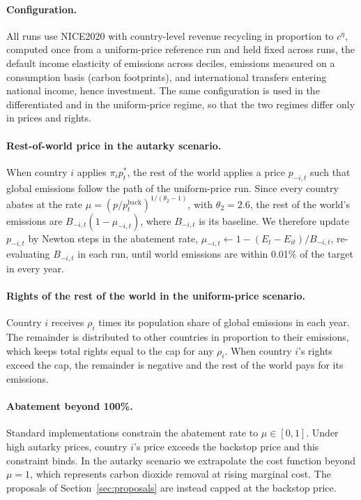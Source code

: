 \documentclass[12pt,english]{article}
\theoremstyle{remark}
\begin{document}
\paragraph{Configuration.} All runs use NICE2020 with country-level revenue recycling in proportion to $c^{\eta}$, computed once from a uniform-price reference run and held fixed across runs, the default income elasticity of emissions across deciles, emissions measured on a consumption basis (carbon footprints), and international transfers entering national income, hence investment. The same configuration is used in the differentiated and in the uniform-price regime, so that the two regimes differ only in prices and rights.

\paragraph{Rest-of-world price in the autarky scenario.} When country $i$ applies $\pi_i p^*_t$, the rest of the world applies a price $p_{-i,t}$ such that global emissions follow the path of the uniform-price run. Since every country abates at the rate $\mu=(p/p^{\mathrm{back}}_t)^{1/(\theta_2-1)}$, with $\theta_2=2.6$, the rest of the world's emissions are $B_{-i,t}(1-\mu_{-i,t})$, where $B_{-i,t}$ is its baseline. We therefore update $p_{-i,t}$ by Newton steps in the abatement rate, $\mu_{-i,t}\leftarrow 1-(E_t-E_{it})/B_{-i,t}$, re-evaluating $B_{-i,t}$ in each run, until world emissions are within 0.01\% of the target in every year.

\paragraph{Rights of the rest of the world in the uniform-price scenario.} Country $i$ receives $\rho_i$ times its population share of global emissions in each year. The remainder is distributed to other countries in proportion to their emissions, which keeps total rights equal to the cap for any $\rho_i$. When country $i$'s rights exceed the cap, the remainder is negative and the rest of the world pays for its emissions.

\paragraph{Abatement beyond 100\%.} Standard implementations constrain the abatement rate to $\mu\in[0,1]$. Under high autarky prices, country $i$'s price exceeds the backstop price and this constraint binds. In the autarky scenario we extrapolate the cost function beyond $\mu=1$, which represents carbon dioxide removal at rising marginal cost. The proposals of Section~\ref{sec:proposals} are instead capped at the backstop price.
\end{document}
